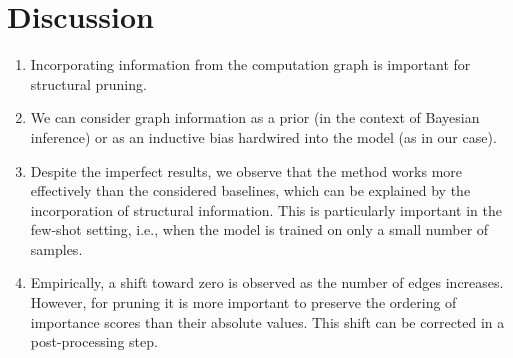 \section{Discussion}
\begin{enumerate}
    \item Incorporating information from the computation graph is important for structural pruning.
    
    \item We can consider graph information as a prior (in the context of Bayesian inference) or as an inductive bias hardwired into the model (as in our case).
    
    \item Despite the imperfect results, we observe that the method works more effectively than the considered baselines, which can be explained by the incorporation of structural information. This is particularly important in the few-shot setting, i.e., when the model is trained on only a small number of samples.
    
    \item Empirically, a shift toward zero is observed as the number of edges increases. However, for pruning it is more important to preserve the ordering of importance scores than their absolute values. This shift can be corrected in a post-processing step.
\end{enumerate}
